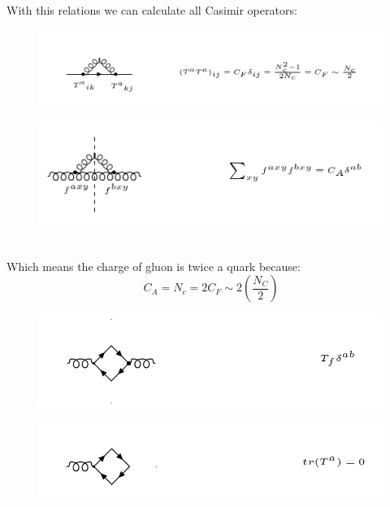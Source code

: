 With this relations we can calculate all Casimir operators:\\
\begin{figure}[h!]
\centering
\includegraphics[scale=0.6]{images/Intro/Casimir1.png}
\end{figure}
\begin{figure}[h!]
\centering
\includegraphics[scale=0.6]{images/Intro/Casimir2.png}
\end{figure}
\pagebreak
\\
Which means the charge of gluon is twice a quark because:
\begin{equation}
 C_A = N_c =2C_F \sim 2(\frac{N_C}{2}) 
\end{equation}
\begin{figure}[h!]
\centering
\includegraphics[scale=0.6]{images/Intro/Casimir3.png}
\end{figure}
\begin{figure}[h!]
\centering
\includegraphics[scale=0.6]{images/Intro/Casimir4.png}
\end{figure}


